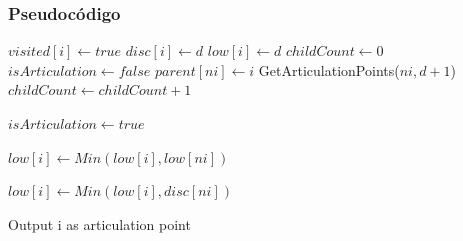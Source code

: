 \subsubsection{Pseudocódigo}
\begin{algorithm}
	\begin{algorithmic}[1]
			\State $visited[i] \leftarrow true$
			\State $disc[i] \leftarrow d$
			\State $low[i] \leftarrow d$
			\State $childCount \leftarrow 0$
			\State $isArticulation \leftarrow false$
					\State $parent[ni] \leftarrow i$
					\State GetArticulationPoints($ni, d + 1$)
					\State $childCount \leftarrow childCount + 1$
					
						\State $isArticulation \leftarrow true$
					\EndIf
					
					\State $low[i] \leftarrow Min(low[i], low[ni])$
					
					\State $low[i] \leftarrow Min(low[i], disc[ni])$
				\EndIf
			\EndFor
			
				\State 
				\Return Output i as articulation point
			\EndIf
		\EndFunction
	\end{algorithmic}
\end{algorithm}

